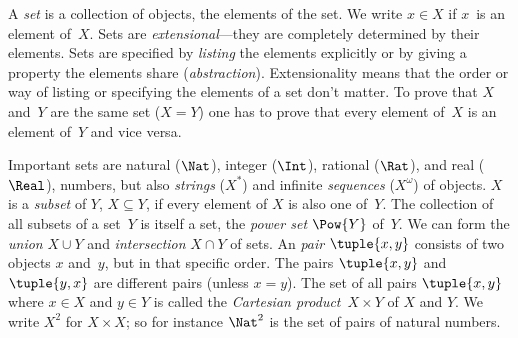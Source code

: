 A \emph{set} is a collection of objects, the elements of the set. We
write $x \in X$ if $x$~is an element of~$X$.  Sets are
\emph{extensional}---they are completely determined by their elements.
Sets are specified by \emph{listing} the elements explicitly or by
giving a property the elements share
(\emph{abstraction}). Extensionality means that the order or way of
listing or specifying the elements of a set don't matter. To prove
that $X$ and~$Y$ are the same set ($X = Y$) one has to prove that
every element of~$X$ is an element of~$Y$ and vice versa.

Important sets are natural ($\Nat$), integer ($\Int$), rational
($\Rat$), and real ($\Real$), numbers, but also \emph{strings} ($X^*$)
and infinite \emph{sequences} ($X^\omega$) of objects. $X$ is a
\emph{subset} of $Y$, $X \subseteq Y$, if every element of $X$ is also
one of~$Y$. The collection of all subsets of a set~$Y$ is itself a
set, the \emph{power set} $\Pow{Y}$ of~$Y$.  We can form the
\emph{union} $X \cup Y$ and \emph{intersection} $X \cap Y$ of sets. An
\emph{pair} $\tuple{x, y}$ consists of two objects $x$ and~$y$, but in
that specific order. The pairs $\tuple{x, y}$ and $\tuple{y, x}$ are
different pairs (unless $x = y$). The set of all pairs $\tuple{x, y}$
where $x \in X$ and $y\in Y$ is called the \emph{Cartesian product}~$X
\times Y$ of $X$ and $Y$. We write $X^2$ for $X \times X$; so for
instance $\Nat^2$ is the set of pairs of natural numbers.
